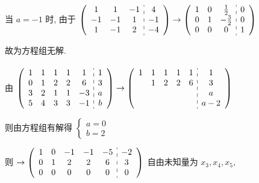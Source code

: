          当 \( a = -1 \) 时, 由于 \( \left(\begin{array}{ccc:c}
                 1  & 1  & -1 & 4  \\
                 -1 & -1 & 1  & -1 \\
                 1  & -1 & 2  & -4
             \end{array}\right) \rightarrow \left(\begin{array}{ccc:c}
                 1 & 0 & \frac{1}{2}  & 0 \\
                 0 & 1 & -\frac{3}{2} & 0 \\
                 0 & 0 & 0            & 1
             \end{array}\right) \)

         故为方程组无解.


     \paragraph{} %
         由 \( \left(\begin{array}{ccccc:c}
                 1 & 1 & 1 & 1 & 1  & 1 \\
                 0 & 1 & 2 & 2 & 6  & 3 \\
                 3 & 2 & 1 & 1 & -3 & a \\
                 5 & 4 & 3 & 3 & -1 & b
             \end{array}\right)
         \to
         \left(\begin{array}{ccccc:c}
                 1 & 1 & 1 & 1 & 1 & 1   \\
                   & 1 & 2 & 2 & 6 & 3   \\
                   &   &   &   &   & a   \\
                   &   &   &   &   & a-2
             \end{array}\right) \)

         则由方程组有解得
         \( \begin{cases}
             a = 0 \\
             b = 2
         \end{cases} \)

         则 \( \rightarrow \left(\begin{array}{ccccc:c}
                 1 & 0 & -1 & -1 & -5 & -2 \\
                 0 & 1 & 2  & 2  & 6  & 3  \\
                 0 & 0 & 0  & 0  & 0  & 0
             \end{array}\right) \) 自由未知量为 \( x_{3}, x_{4}, x_{5} \),

